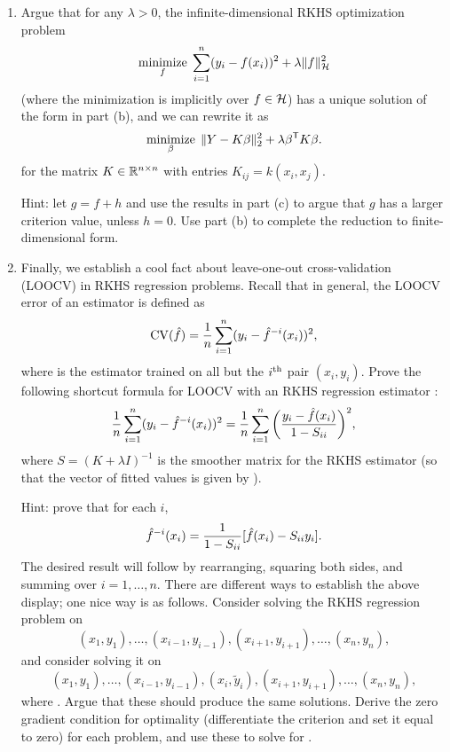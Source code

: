 \documentclass{article}
\begin{document}
\begin{enumerate}[label=(\alph*)]
\item Argue that for any $\lambda > 0$, the infinite-dimensional RKHS
  optimization problem 
  \[
  \mathop{\mathrm{minimize}}_f \; \sum_{i=1}^n (y_i - f(x_i))^2 + \lambda \|f\|_{\mathcal{H}}^2
  \]
  (where the minimization is implicitly over $f \in \mathcal{H}$) has a unique solution
  of the form in part (b), and we can rewrite it as
  \marginpar{\small [2 pts]}
  \[
  \mathop{\mathrm{minimize}}_\beta \; \|Y - K\beta\|_2^2 + \lambda \beta^{\mathsf{T}} K \beta. 
  \]
  for the matrix $K \in \mathbb{R}^{n \times n}$ with entries $K_{ij} = k(x_i, x_j)$. 

  Hint: let $g = f+h$ and use the results in part (c) to argue that $g$ has a
  larger criterion value, unless $h=0$. Use part (b) to complete the reduction
  to finite-dimensional form. 

\item Finally, we establish a cool fact about leave-one-out cross-validation
  (LOOCV) in RKHS regression problems. Recall that in general, the LOOCV error
  of an estimator \smash{$\hf$} is defined as
  \[
  \mathrm{CV}(\hat{f}) = \frac{1}{n} \sum_{i=1}^n (y_i - \hat{f}^{-i}(x_i))^2,
  \]
  where  is the estimator trained on all but the $i^{\text{th}}$ pair 
  $(x_i,y_i)$. Prove the following shortcut formula for LOOCV with an RKHS
  regression estimator \smash{$\hf$}:  
  \marginpar{\small [6 pts]}
  \[
  \frac{1}{n} \sum_{i=1}^n (y_i - \hat{f}^{-i}(x_i))^2 = 
  \frac{1}{n} \sum_{i=1}^n \bigg(\frac{y_i - \hat{f}(x_i)}{1-S_{ii}}\bigg)^2,
  \]
  where $S=(K + \lambda I)^{-1}$ is the smoother matrix for the RKHS estimator
  (so that the vector of fitted values is given by ). 

  Hint: prove that for each $i$,
  \[
  \hat{f}^{-i}(x_i) = \frac{1}{1-S_{ii}} [\hat{f}(x_i) - S_{ii}y_i].
  \]
  The desired result will follow by rearranging, squaring both sides, and
  summing over $i=1,\dots,n$. There are different ways to establish the above
  display; one nice way is as follows. Consider solving the RKHS regression
  problem on 
  \[
    (x_1,y_1), \dots, (x_{i-1},y_{i-1}), (x_{i+1},y_{i+1}), \dots, (x_n,y_n), 
  \]
  and consider solving it on 
  \[
    (x_1,y_1), \dots, (x_{i-1},y_{i-1}), (x_i, \tilde{y}_i), (x_{i+1},y_{i+1}),
    \dots, (x_n,y_n), 
  \]
  where . Argue that these should produce
  the same solutions. Derive the zero gradient condition for optimality
  (differentiate the criterion and set it equal to zero) for each problem, and
  use these to solve for . 
\end{enumerate}
\end{document}
